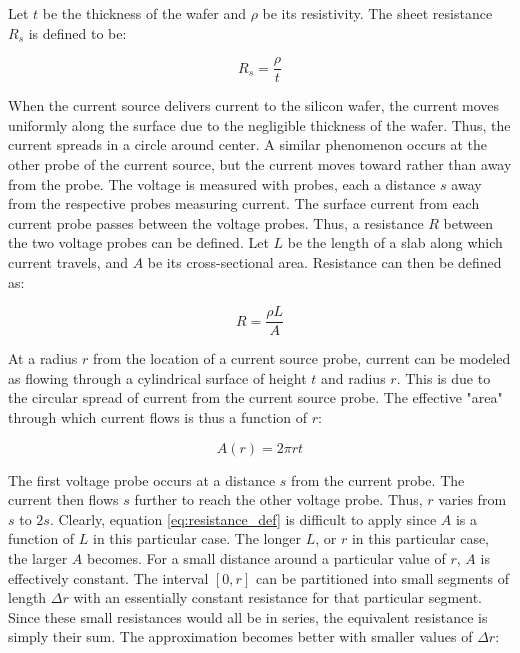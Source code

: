 Let $t$ be the thickness of the wafer and $\rho$ be its resistivity. The sheet resistance $R_s$ is defined to be:

\begin{equation}
	\label{eq:rs_def}
	R_s = \frac{ \rho }{ t }
\end{equation}

When the current source delivers current to the silicon wafer, the current moves uniformly along the surface due to the negligible thickness of the wafer. Thus, the current spreads in a circle around center. A similar phenomenon occurs at the other probe of the current source, but the current moves toward rather than away from the probe.
The voltage is measured with probes, each a distance $s$ away from the respective probes measuring current. The surface current from each current probe passes between the voltage probes. Thus, a resistance $R$ between the two voltage probes can be defined.
Let $L$ be the length of a slab along which current travels, and $A$ be its cross-sectional area. Resistance can then be defined as:

\begin{equation}
	\label{eq:resistance_def}
	R = \frac{ \rho L }{ A }
\end{equation}

At a radius $r$ from the location of a current source probe, current can be modeled as flowing through a cylindrical surface of height $t$ and radius $r$. This is due to the circular spread of current from the current source probe. The effective "area" through which current flows is thus a function of $r$:

\begin{equation}
	\label{eq:area_fn}
	A(r) = 2 \pi r t
\end{equation}

The first voltage probe occurs at a distance $s$ from the current probe. The current then flows $s$ further to reach the other voltage probe. Thus, $r$ varies from $s$ to $2s$. Clearly, equation \ref{eq:resistance_def} is difficult to apply since $A$ is a function of $L$ in this particular case. The longer $L$, or $r$ in this particular case, the larger $A$ becomes.
For a small distance around a particular value of $r$, $A$ is effectively constant. The interval $[0,r]$ can be partitioned into small segments of length $\Delta r$ with an essentially constant resistance for that particular segment. Since these small resistances would all be in series, the equivalent resistance is simply their sum. The approximation becomes better with smaller values of $\Delta r$:


